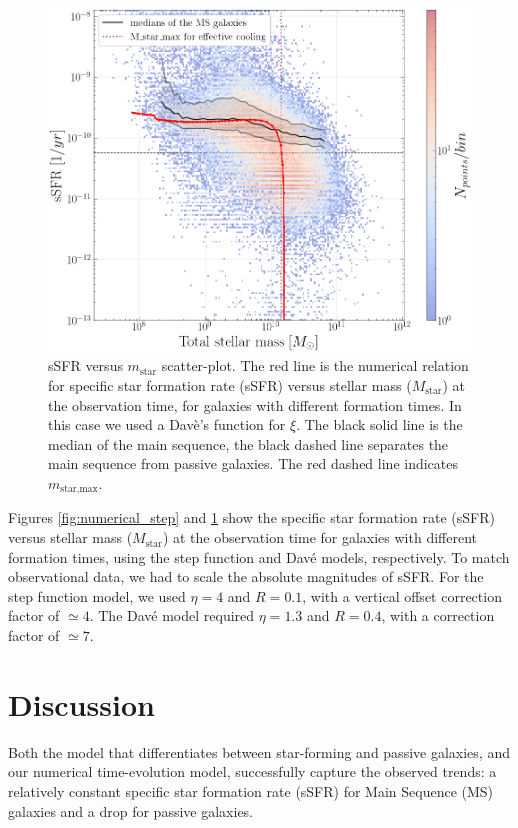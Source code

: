 \documentclass[fleqn,usenatbib]{mnras}
\begin{document}
\begin{figure}\centering
	\includegraphics[width=0.86\columnwidth]{images/sSFR_mass_Cantacode_csi_Dave.png}
    \caption{sSFR versus $m_\text{star}$ scatter-plot. The red line is the numerical relation for specific star formation rate (sSFR) versus stellar mass ($M_\text{star}$) at the observation time, for galaxies with different formation times. In this case we used a Davè's function for $\xi$.
    The black solid line is the median of the main sequence, the black dashed line separates the main sequence from passive galaxies. The red dashed line indicates $m_\text{star,max}$. }
    \label{fig:numerical_dave}
\end{figure}


Figures \ref{fig:numerical_step} and \ref{fig:numerical_dave} show the specific star formation rate (sSFR) versus stellar mass ($M_\text{star}$) at the observation time for galaxies with different formation times, using the step function and Davé models, respectively.
To match observational data, we had to scale the absolute magnitudes of sSFR. For the step function model, we used $\eta=4$ and $R=0.1$, with a vertical offset correction factor of $\simeq
4$. The Davé model required $\eta=1.3$ and $R=0.4$, with a correction factor of $\simeq 7$.



\section{Discussion}

Both the model that differentiates between star-forming and passive galaxies, and our numerical time-evolution model, successfully capture the observed trends: a relatively constant specific star formation rate (sSFR) for Main Sequence (MS) galaxies and a drop for passive galaxies.\\
\end{document}
